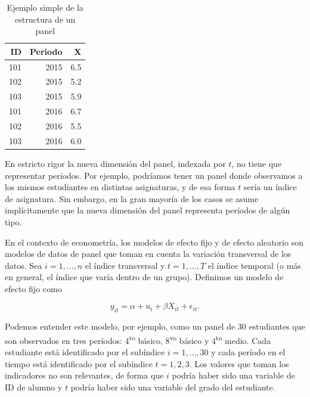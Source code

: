 \documentclass{article}\usepackage[]{graphicx}\usepackage[]{color}
\begin{document}
\begin{table}[h]
\centering
\caption{Ejemplo simple de la estructura de un panel}
\label{tab:panel_simple}
\ttfamily
\begin{tabular}{rrr}
  \toprule
  ID & Periodo & X \\
  \midrule
  101 & 2015 & 6.5 \\
  102 & 2015 & 5.2 \\
  103 & 2015 & 5.9 \\
  \midrule
  101 & 2016 & 6.7 \\
  102 & 2016 & 5.5 \\
  103 & 2016 & 6.0 \\
  \bottomrule
\end{tabular}
\end{table}



En estricto rigor la nueva dimensión del panel, indexada por $t$, no tiene que representar períodos. Por ejemplo, podríamos tener un panel donde observamos a los mismos estudiantes en distintas asignaturas, y de esa forma $t$ sería un índice de asignatura. Sin embargo, en la gran mayoría de los casos se asume implícitamente que la nueva dimensión del panel representa períodos de algún tipo.

En el contexto de econometría, los modelos de efecto fijo y de efecto aleatorio son modelos de datos de panel que toman en cuenta la variación transversal de los datos. Sea $i=1,\ldots,n$ el índice transversal y $t=1,\ldots,T$ el índice temporal (o más en general, el índice que varía dentro de un grupo). Definimos un modelo de efecto fijo como

\begin{equation}
y_{it} = \alpha + u_i + \beta X_{it} + \epsilon_{it}.
\label{eq:FE-RE}
\end{equation}

Podemos entender este modelo, por ejemplo, como un panel de 30 estudiantes que son observados en tres períodos: 4\textsuperscript{to} básico, 8\textsuperscript{vo} básico y 4\textsuperscript{to} medio. Cada estudiante está identificado por el subíndice $i=1,\ldots,30$ y cada período en el tiempo está identificado por el subíndice $t=1,2,3$. Los valores que toman los indicadores no son relevantes, de forma que $i$ podría haber sido una variable de ID de alumno y $t$ podría haber sido una variable del grado del estudiante.
\end{document}
